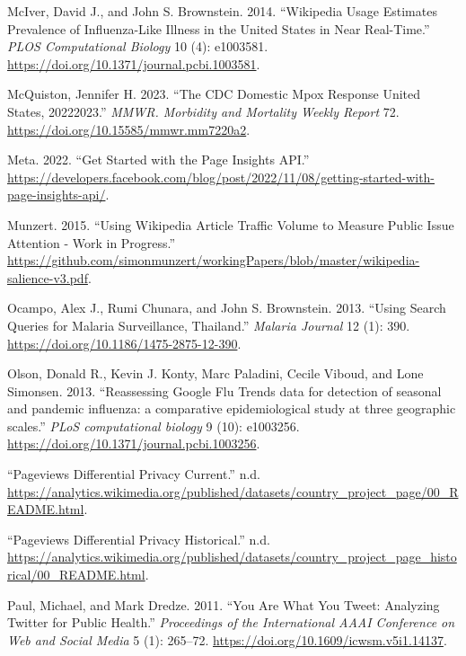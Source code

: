 \documentclass[
  12pt,
]{article}
\newlength{\cslhangindent}
\newenvironment{CSLReferences}[2] %
 {\begin{list}{}{%
  \setlength{\itemindent}{0pt}
  \setlength{\leftmargin}{0pt}
  \setlength{\parsep}{0pt}
  \ifodd #1
   \setlength{\leftmargin}{\cslhangindent}
   \setlength{\itemindent}{-1\cslhangindent}
  \fi
  \setlength{\itemsep}{#2\baselineskip}}}
 {\end{list}}
\begin{document}
\begin{CSLReferences}{1}{0}
McIver, David J., and John S. Brownstein. 2014. {``Wikipedia Usage
Estimates Prevalence of Influenza-Like Illness in the United States in
Near Real-Time.''} \emph{PLOS Computational Biology} 10 (4): e1003581.
\url{https://doi.org/10.1371/journal.pcbi.1003581}.

McQuiston, Jennifer H. 2023. {``The CDC Domestic Mpox Response
{\textemdash} United States, 2022{\textendash}2023.''} \emph{MMWR.
Morbidity and Mortality Weekly Report} 72.
\url{https://doi.org/10.15585/mmwr.mm7220a2}.

Meta. 2022. {``Get Started with the Page Insights API.''}
\url{https://developers.facebook.com/blog/post/2022/11/08/getting-started-with-page-insights-api/}.

Munzert. 2015. {``Using Wikipedia Article Traffic Volume to Measure
Public Issue Attention - Work in Progress.''}
\url{https://github.com/simonmunzert/workingPapers/blob/master/wikipedia-salience-v3.pdf}.

Ocampo, Alex J., Rumi Chunara, and John S. Brownstein. 2013. {``Using
Search Queries for Malaria Surveillance, Thailand.''} \emph{Malaria
Journal} 12 (1): 390. \url{https://doi.org/10.1186/1475-2875-12-390}.

Olson, Donald R., Kevin J. Konty, Marc Paladini, Cecile Viboud, and Lone
Simonsen. 2013. {``Reassessing Google Flu Trends data for detection of
seasonal and pandemic influenza: a comparative epidemiological study at
three geographic scales.''} \emph{PLoS computational biology} 9 (10):
e1003256. \url{https://doi.org/10.1371/journal.pcbi.1003256}.

{``Pageviews Differential Privacy {\textemdash} Current.''} n.d.
\url{https://analytics.wikimedia.org/published/datasets/country_project_page/00_README.html}.

{``Pageviews Differential Privacy {\textemdash} Historical.''} n.d.
\url{https://analytics.wikimedia.org/published/datasets/country_project_page_historical/00_README.html}.

Paul, Michael, and Mark Dredze. 2011. {``You Are What You Tweet:
Analyzing Twitter for Public Health.''} \emph{Proceedings of the
International AAAI Conference on Web and Social Media} 5 (1): 265--72.
\url{https://doi.org/10.1609/icwsm.v5i1.14137}.


\end{CSLReferences}
\end{document}
